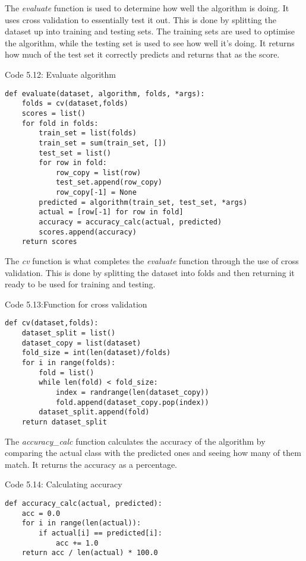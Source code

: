 The \textit{evaluate} function is used to determine how well the algorithm is doing. It uses cross validation to essentially test it out. This is done by splitting the dataset up into training and testing sets. The training sets are used to optimise the algorithm, while the testing set is used to see how well it's doing. It returns how much of the test set it correctly predicts and returns that as the score.
\begin{center} 
Code 5.12: Evaluate algorithm
\end{center}
\begin{lstlisting}
def evaluate(dataset, algorithm, folds, *args):
    folds = cv(dataset,folds)
    scores = list()
    for fold in folds:
        train_set = list(folds)
        train_set = sum(train_set, [])
        test_set = list()
        for row in fold:
            row_copy = list(row)
            test_set.append(row_copy)
            row_copy[-1] = None
        predicted = algorithm(train_set, test_set, *args)
        actual = [row[-1] for row in fold]
        accuracy = accuracy_calc(actual, predicted)
        scores.append(accuracy)
    return scores
\end{lstlisting}

The \textit{cv} function is what completes the \textit{evaluate} function through the use of cross validation. This is done by splitting the dataset into folds and then returning it ready to be used for training and testing.
\begin{center} 
Code 5.13:Function for cross validation
\end{center}
\begin{lstlisting}
def cv(dataset,folds):
    dataset_split = list()
    dataset_copy = list(dataset)
    fold_size = int(len(dataset)/folds)
    for i in range(folds):
        fold = list()
        while len(fold) < fold_size:
            index = randrange(len(dataset_copy))
            fold.append(dataset_copy.pop(index))
        dataset_split.append(fold)
    return dataset_split
\end{lstlisting}

The \textit{accuracy\_calc} function calculates the accuracy of the algorithm by comparing the actual class with the predicted ones and seeing how many of them match. It returns the accuracy as a percentage. 
\begin{center} 
Code 5.14: Calculating accuracy
\end{center}
\begin{lstlisting}
def accuracy_calc(actual, predicted):
    acc = 0.0
    for i in range(len(actual)):
        if actual[i] == predicted[i]:
            acc += 1.0
    return acc / len(actual) * 100.0
\end{lstlisting}

